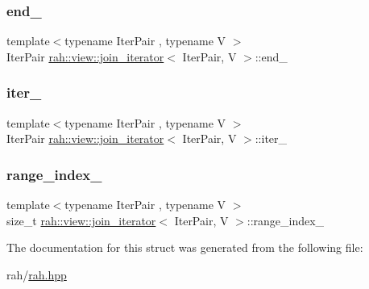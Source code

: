 \subsubsection{\texorpdfstring{end\_}{end\_}}
{\footnotesize\ttfamily template$<$typename Iter\+Pair , typename V $>$ \\
Iter\+Pair \mbox{\hyperlink{structrah_1_1view_1_1join__iterator}{rah\+::view\+::join\+\_\+iterator}}$<$ Iter\+Pair, V $>$\+::end\+\_\+}

\mbox{\label{structrah_1_1view_1_1join__iterator_a53c423f97b1bb286a5eacd76de3d73c9}} 
\subsubsection{\texorpdfstring{iter\_}{iter\_}}
{\footnotesize\ttfamily template$<$typename Iter\+Pair , typename V $>$ \\
Iter\+Pair \mbox{\hyperlink{structrah_1_1view_1_1join__iterator}{rah\+::view\+::join\+\_\+iterator}}$<$ Iter\+Pair, V $>$\+::iter\+\_\+}

\mbox{\label{structrah_1_1view_1_1join__iterator_a7132064b94d8ae051bb8039fa1dfd4e0}} 
\subsubsection{\texorpdfstring{range\_index\_}{range\_index\_}}
{\footnotesize\ttfamily template$<$typename Iter\+Pair , typename V $>$ \\
size\+\_\+t \mbox{\hyperlink{structrah_1_1view_1_1join__iterator}{rah\+::view\+::join\+\_\+iterator}}$<$ Iter\+Pair, V $>$\+::range\+\_\+index\+\_\+}



The documentation for this struct was generated from the following file\+:\begin{DoxyCompactItemize}
\item 
rah/\mbox{\hyperlink{rah_8hpp}{rah.\+hpp}}\end{DoxyCompactItemize}
